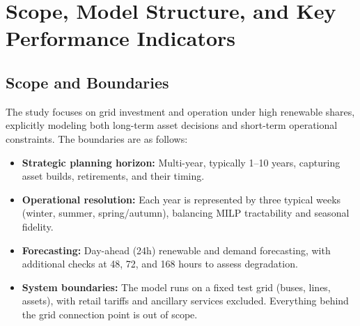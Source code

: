 \newpage
\section{Scope, Model Structure, and Key Performance Indicators}
\label{sec:scope_model}

\subsection{Scope and Boundaries}
The study focuses on grid investment and operation under high renewable shares, explicitly modeling both long-term asset decisions and short-term operational constraints. The boundaries are as follows:
\begin{itemize}
    \item \textbf{Strategic planning horizon:} Multi-year, typically 1–10 years, capturing asset builds, retirements, and their timing.
    \item \textbf{Operational resolution:} Each year is represented by three typical weeks (winter, summer, spring/autumn), balancing MILP tractability and seasonal fidelity.
    \item \textbf{Forecasting:} Day-ahead (24h) renewable and demand forecasting, with additional checks at 48, 72, and 168 hours to assess degradation.
    \item \textbf{System boundaries:} The model runs on a fixed test grid (buses, lines, assets), with retail tariffs and ancillary services excluded. Everything behind the grid connection point is out of scope.
\end{itemize}

